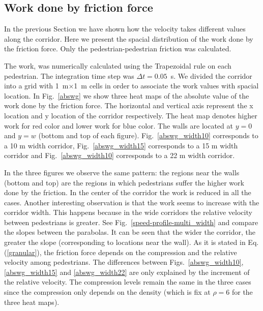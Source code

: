 \subsection{Work done by friction force}

In the previous Section we have shown how the velocity takes different values along the corridor. Here we present the spacial distribution of the work done by the friction force. Only the pedestrian-pedestrian friction was calculated.

The work, was numerically calculated using the Trapezoidal rule on each pedestrian. The integration time step was $\Delta t = 0.05$~s. We divided the corridor into a grid with 1~m$\times$1~m cells in order to associate the work values with spacial location. In Fig.~\ref{abswg} we show three heat maps of the absolute value of the work done by the friction force. The horizontal and vertical axis represent the x location and y location of the corridor respectively. The heat map denotes higher work for red color and lower work for blue color. The walls are located at $y=0$ and $y=w$ (bottom and top of each figure). Fig.~\ref{abswg_width10} corresponds to a 10 m width corridor, Fig.~\ref{abswg_width15} corresponds to a 15 m width corridor and Fig.~\ref{abswg_width10} corresponds to a 22 m width corridor.

In the three figures we observe the same pattern: the regions near the walls (bottom and top) are the regions in which pedestrians suffer the higher work done by the friction. In the center of the corridor the work is reduced in all the cases. Another interesting observation is that the work seems to increase with the corridor width. This happens because in the wide corridors the relative velocity between pedestrians is greater. See Fig.~\ref{speed-profile-multi_width} and compare the slopes between the parabolas. It can be seen that the wider the corridor, the greater the slope (corresponding to locations near the wall). As it is stated in Eq.(\ref{granular}), the friction force depends on the compression and the relative velocity among pedestrians. The differences between Figs.~\ref{abswg_width10}, \ref{abswg_width15} and  \ref{abswg_width22}  are only explained by the increment of the relative velocity. The compression levels remain the same in the three cases since the compression only depends on the density (which is fix at $\rho=6$ for the three heat maps).



